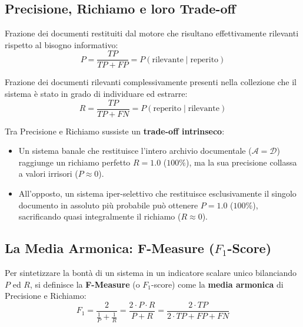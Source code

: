 \FloatBarrier
\subsection{Precisione, Richiamo e loro Trade-off}
\label{subsec:precision-recall-tradeoff}

\begin{definition}
Frazione dei documenti restituiti dal motore che risultano effettivamente rilevanti rispetto al bisogno informativo:
\begin{equation}
P = \frac{TP}{TP + FP} = P(\text{rilevante} \mid \text{reperito})
\end{equation}
\end{definition}

\begin{definition}
Frazione dei documenti rilevanti complessivamente presenti nella collezione che il sistema \`e stato in grado di individuare ed estrarre:
\begin{equation}
R = \frac{TP}{TP + FN} = P(\text{reperito} \mid \text{rilevante})
\end{equation}
\end{definition}

Tra Precisione e Richiamo sussiste un \textbf{trade-off intrinseco}:
\begin{itemize}
    \item Un sistema banale che restituisce l'intero archivio documentale ($\mathcal{A} = \mathcal{D}$) raggiunge un richiamo perfetto $R = 1.0$ ($100\%$), ma la sua precisione collassa a valori irrisori ($P \approx 0$).
    \item All'opposto, un sistema iper-selettivo che restituisce esclusivamente il singolo documento in assoluto pi\`u probabile può ottenere $P = 1.0$ ($100\%$), sacrificando quasi integralmente il richiamo ($R \approx 0$).
\end{itemize}

\FloatBarrier
\subsection{La Media Armonica: F-Measure ($F_1$-Score)}
\label{subsec:f-measure-armonica}

Per sintetizzare la bont\`a di un sistema in un indicatore scalare unico bilanciando $P$ ed $R$, si definisce la \textbf{F-Measure} (o $F_1$-score) come la \textbf{media armonica} di Precisione e Richiamo:
\begin{equation}
F_1 = \frac{2}{\frac{1}{P} + \frac{1}{R}} = \frac{2 \cdot P \cdot R}{P + R} = \frac{2 \cdot TP}{2 \cdot TP + FP + FN}
\end{equation}

